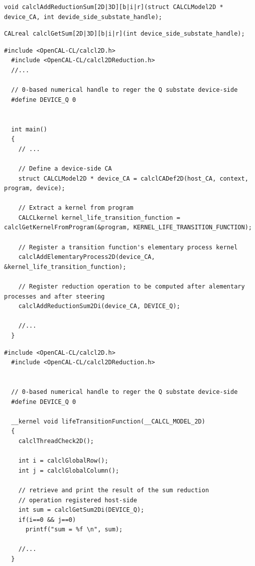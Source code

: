 \begin{lstlisting}[float,floatplacement=H, label=lst:calclAddReductionSum2Dr, caption=The calclAddReductionSum2Dr() host-side reduction registration function., numbers=none]
  void calclAddReductionSum[2D|3D][b|i|r](struct CALCLModel2D * device_CA, int devide_side_substate_handle);
\end{lstlisting}

\begin{lstlisting}[float,floatplacement=H, label=lst:calclGetSum2Dr, caption=The calclGetSum2Dr() device-side reduction retriving function., numbers=none]
  CALreal calclGetSum[2D|3D][b|i|r](int device_side_substate_handle);
\end{lstlisting}



\begin{lstlisting}[float, label=lst:calcl_reduction_example_host, caption=An example of global reduction operation in a host-side OpenCAL-CL application.]
  #include <OpenCAL-CL/calcl2D.h>
  #include <OpenCAL-CL/calcl2DReduction.h>
  //...

  // 0-based numerical handle to reger the Q substate device-side
  #define DEVICE_Q 0

  
  int main()
  {
    // ...
    
    // Define a device-side CA
    struct CALCLModel2D * device_CA = calclCADef2D(host_CA, context, program, device);

    // Extract a kernel from program
    CALCLkernel kernel_life_transition_function = calclGetKernelFromProgram(&program, KERNEL_LIFE_TRANSITION_FUNCTION);

    // Register a transition function's elementary process kernel
    calclAddElementaryProcess2D(device_CA, &kernel_life_transition_function);

    // Register reduction operation to be computed after alementary processes and after steering
    calclAddReductionSum2Di(device_CA, DEVICE_Q);

    //...
  }
\end{lstlisting}


\begin{lstlisting}[float, label=lst:calcl_reduction_example_device, caption=An example of global reduction operation in a device-side OpenCAL-CL application.]
  #include <OpenCAL-CL/calcl2D.h>
  #include <OpenCAL-CL/calcl2DReduction.h>
  

  // 0-based numerical handle to reger the Q substate device-side
  #define DEVICE_Q 0

  __kernel void lifeTransitionFunction(__CALCL_MODEL_2D)
  {
    calclThreadCheck2D();
    
    int i = calclGlobalRow();
    int j = calclGlobalColumn();

    // retrieve and print the result of the sum reduction
    // operation registered host-side
    int sum = calclGetSum2Di(DEVICE_Q);
    if(i==0 && j==0) 	
      printf("sum = %f \n", sum);

    //...
  } 
\end{lstlisting}
